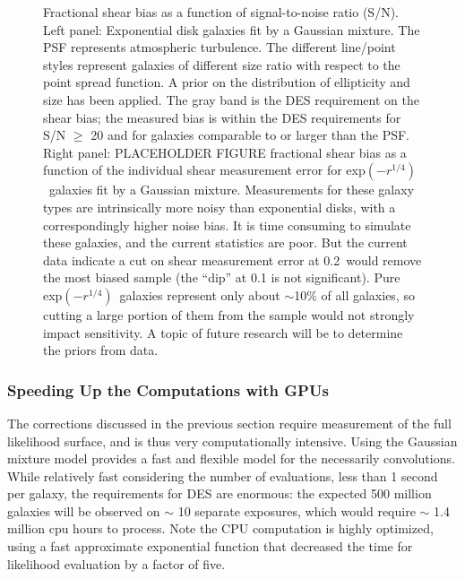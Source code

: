 \documentclass[12pt]{article}
\newcommand{\devprof}{exp$(-r^{1/4})$}
\newcommand{\errcut}{0.2}
\begin{document}
\begin{figure}[t]
\caption{Fractional shear bias as a function of signal-to-noise ratio (S/N).
Left panel: Exponential disk galaxies fit by a Gaussian mixture.  The PSF
represents atmospheric turbulence.  The different line/point styles represent
galaxies of different size ratio with respect to the point spread function.  A
prior on the distribution of ellipticity and size has been applied.  The gray
band is the DES requirement on the shear bias; the measured bias is within the
DES requirements for S/N $\geq$ 20 and for galaxies comparable to or larger
than the PSF.  Right panel: PLACEHOLDER FIGURE fractional shear bias as a
function of the individual shear measurement error for \devprof\ galaxies fit
by a Gaussian mixture.  Measurements for these galaxy types are intrinsically
more noisy than exponential disks, with a correspondingly higher noise bias. It
is time consuming to simulate these galaxies, and the current statistics are
poor. But the current data indicate a cut on shear measurement error at
\errcut\ would remove the most biased sample (the ``dip'' at 0.1 is not
significant).  Pure \devprof\ galaxies represent only about $\sim$10\% of all
galaxies, so cutting a large portion of them from the sample would not strongly
impact sensitivity. A topic of future research will be to determine the priors
from data.  \label{fig:getgdt}}

\end{figure}

\subsubsection{Speeding Up the Computations with GPUs} \label{sec:gmix:gpu}

The corrections discussed in the previous section require measurement of the
full likelihood surface, and is thus very computationally intensive.  Using the
Gaussian mixture model provides a fast and flexible model for the necessarily
convolutions.   While relatively fast considering the number of evaluations,
less than 1 second per galaxy, the requirements for DES are enormous: the
expected 500 million galaxies will be observed on $\sim$ 10 separate exposures,
which would require $\sim$ 1.4 million cpu hours to process. Note the CPU
computation is highly optimized, using a fast approximate exponential function
that decreased the time for likelihood evaluation by a factor of five.
\end{document}
